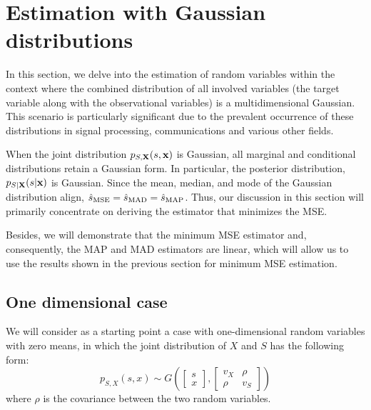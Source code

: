 \section{Estimation with Gaussian distributions}

In this section, we delve into the estimation of random variables within the context where the combined distribution of all involved variables (the target variable along with the observational variables) is a multidimensional Gaussian. This scenario is particularly significant due to the prevalent occurrence of these distributions in signal processing, communications and various other fields. 

When the joint distribution $p_{S,{\bf X}} (s, {\bf x})$ is Gaussian, all marginal and conditional distributions retain a Gaussian form. In particular, the posterior distribution, $p_{S|{\bf X}} (s|{\bf x})$ is Gaussian. Since the mean, median, and mode of the Gaussian distribution align, $\hat{s}_\text{MSE} = \hat{s}_\text{MAD} = \hat{s}_\text{MAP}$. Thus, our discussion in this section will primarily concentrate on deriving the estimator that minimizes the MSE.

Besides, we will demonstrate that the minimum MSE estimator and, consequently, the MAP and MAD estimators are linear, which will allow us to use the results shown in the previous section for minimum MSE estimation.


\subsection{One dimensional case}

We will consider as a starting point a case with one-dimensional random variables with zero means, in which the joint distribution of $X$ and $S$ has the following form:
\begin{equation}
p_{S,X}(s,x) \sim G\left(\begin{bmatrix} s \\ x \end{bmatrix},
                         \begin{bmatrix} v_X & \rho \\ \rho & v_S \end{bmatrix}\right)
\end{equation}
where $\rho$ is the covariance between the two random variables.

